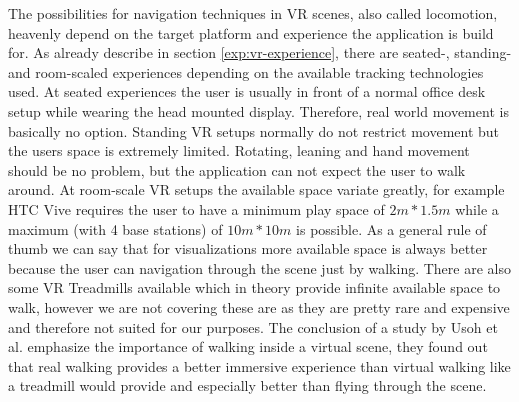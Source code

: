 The possibilities for navigation techniques in VR scenes, also called locomotion, heavenly depend on the target platform and experience the application is build for. As already describe in section \ref{exp:vr-experience}, there are seated-, standing- and room-scaled experiences depending on the available tracking technologies used.
At seated experiences the user is usually in front of a normal office desk setup while wearing the head mounted display. Therefore, real world movement is basically no option. 
Standing VR setups normally do not restrict movement but the users space is extremely limited. Rotating, leaning and hand movement should be no problem, but the application can not expect the user to walk around.
At room-scale VR setups the available space variate greatly, for example HTC Vive requires the user to have a minimum play space of $2m * 1.5m$ while a maximum (with 4 base stations) of $10m * 10m$ is possible. As a general rule of thumb we can say that for visualizations more available space is always better because the user can navigation through the scene just by walking. 
There are also some VR Treadmills available which in theory provide infinite available space to walk, however we are not covering these are as they are pretty rare and expensive and therefore not suited for our purposes. The conclusion of a study by Usoh et al. \cite{usoh_walking_1999} emphasize the importance of walking inside a virtual scene, they found out that real walking provides a better immersive experience than virtual walking like a treadmill would provide and especially better than flying through the scene. 

